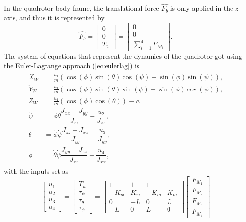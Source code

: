 \\\\
In the quadrotor body-frame, the translational force $\hat{F_{b}}$ is only applied in the $z$-axis, and thus it is represented by
\begin{equation}
	\hat{F_{b}}=\begin{bmatrix}
	0\\
	0\\
	T_u
	\end{bmatrix} = \begin{bmatrix}
	0\\
	0\\
	\sum_{i=1}^{4}F_{M_i}
	\end{bmatrix}.
 \label{ec:fuerzas}
 \end{equation} 
The system of equations that represent the dynamics of the quadrotor got using the Euler-Lagrange approach (\ref{ec:eulerlag}) is
\begin{align}
\label{ec:eomEulerLagrange}
\begin{split}
\ddot{X}_W &= \frac{u_{1}}{m}(\cos(\phi)\sin(\theta)\cos(\psi) + \sin(\phi)\sin(\psi)), \\[5pt]
\ddot{Y}_W &= \frac{u_{1}}{m}(\cos(\phi)\sin(\theta)\sin(\psi) - \sin(\phi)\cos(\psi)), \\[5pt]
\ddot{Z}_W &= \frac{u_{1}}{m}(\cos(\phi)\cos(\theta)) - g, \\[5pt]
\ddot{\psi} & = \dot{\phi}\dot{\theta}\dfrac{J_{xx}-J_{yy}}{J_{zz}} + \dfrac{u_{2}}{J_{zz}}, \\[5pt]
\ddot{\theta} & = \dot{\phi}\dot{\psi}\dfrac{J_{zz}-J_{xx}}{J_{yy}} + \dfrac{u_{3}}{J_{yy}}, \\[5pt]
\ddot{\phi} & = \dot{\theta}\dot{\psi}\dfrac{J_{yy}-J_{zz}}{J_{xx}} +  \dfrac{u_{4}}{J_{xx}},
\end{split}
\end{align}
with the inputs set as
\begin{equation}
\begin{bmatrix}
u_1 \\[5pt] u_2 \\[5pt] u_3 \\[5pt] u_4
\end{bmatrix} = \begin{bmatrix}
	T_u\\[5pt]
	\tau_{\psi}\\[5pt]
	\tau_{\theta}\\[5pt]
	\tau_{\phi}
	\end{bmatrix} = \begin{bmatrix}
	1 & 1 & 1 & 1 \\[5pt]
	-K_{m} & K_{m} & -K_{m} & K_{m}\\[5pt]
	0 & -L & 0 & L\\[5pt]
	-L & 0 & L & 0
							\end{bmatrix}
\begin{bmatrix}
F_{M_1}\\[5pt]
F_{M_2}\\[5pt]
F_{M_3}\\[5pt]
F_{M_4}
\end{bmatrix}					
\end{equation}
